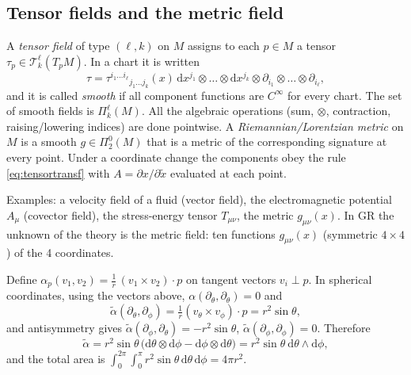 \documentclass[11pt,a4paper]{article}
\numberwithin{equation}{section}
\theoremstyle{definition}
\theoremstyle{plain}
\newcommand{\dd}{\mathrm{d}}
\newcommand{\TT}[2]{\mathcal{T}^{#1}_{#2}}          %
\newcommand{\TF}[2]{\Pi^{#1}_{#2}}                  %
\begin{document}
\subsection{Tensor fields and the metric field}\label{sec:tensorfields}
\begin{formal}
A \emph{tensor field} of type $(\ell,k)$ on $M$ assigns to each $p\in M$ a tensor $\tau_p\in\TT{\ell}{k}(T_pM)$. In a chart it is written
\[
\tau=\tau^{i_1\dots i_\ell}{}_{j_1\dots j_k}(x)\,\dd x^{j_1}\otimes\dots\otimes\dd x^{j_k}\otimes\partial_{i_1}\otimes\dots\otimes\partial_{i_\ell},
\]
and it is called \emph{smooth} if all component functions are $C^\infty$ for every chart. The set of smooth fields is $\TF{\ell}{k}(M)$. All the algebraic operations (sum, $\otimes$, contraction, raising/lowering indices) are done pointwise. A \emph{Riemannian/Lorentzian metric} on $M$ is a smooth $g\in\TF{0}{2}(M)$ that is a metric of the corresponding signature at every point. Under a coordinate change the components obey the rule \eqref{eq:tensortransf} with $A=\partial x/\partial\tilde x$ evaluated at each point.
\end{formal}
\begin{intuition}[{a field = a tensor at every point, varying smoothly}]
Examples: a velocity field of a fluid (vector field), the electromagnetic potential $A_\mu$ (covector field), the stress-energy tensor $T_{\mu\nu}$, the metric $g_{\mu\nu}(x)$. In GR the unknown of the theory is the metric field: ten functions $g_{\mu\nu}(x)$ (symmetric $4\times4$) of the 4 coordinates.
\end{intuition}

\begin{example}
Define $\alpha_p(v_1,v_2)=\frac1r\,(v_1\times v_2)\cdot p$ on tangent vectors $v_i\perp p$. In spherical coordinates, using the vectors above, $\alpha(\partial_\theta,\partial_\theta)=0$ and
\[
\tilde\alpha(\partial_\theta,\partial_\phi)=\tfrac1r(v_\theta\times v_\phi)\cdot p=r^2\sin\theta,
\]
and antisymmetry gives $\tilde\alpha(\partial_\phi,\partial_\theta)=-r^2\sin\theta$, $\tilde\alpha(\partial_\phi,\partial_\phi)=0$. Therefore
\[
\tilde\alpha=r^2\sin\theta\,\big(\dd\theta\otimes\dd\phi-\dd\phi\otimes\dd\theta\big)=r^2\sin\theta\ \dd\theta\wedge\dd\phi,
\]
and the total area is $\int_0^{2\pi}\!\!\int_0^\pi r^2\sin\theta\,\dd\theta\,\dd\phi=4\pi r^2$. \checkmark
\end{example}
\end{document}
